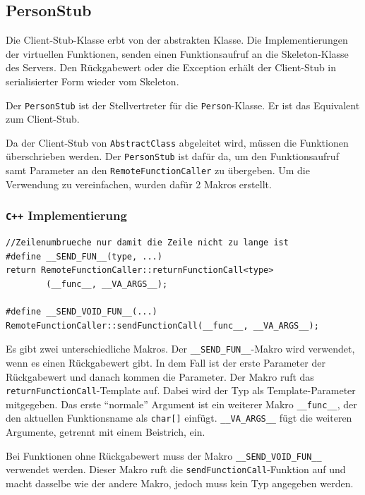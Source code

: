 \documentclass[a4paper,oneside,10pt]{report}
\begin{document}
\subsection{PersonStub}

Die Client-Stub-Klasse erbt von der abstrakten Klasse. Die Implementierungen der virtuellen Funktionen, senden einen Funktionsaufruf an die Skeleton-Klasse des Servers. Den Rückgabewert oder die Exception erhält der Client-Stub in serialisierter Form wieder vom Skeleton. 

Der \texttt{PersonStub} ist der Stellvertreter für die \texttt{Person}-Klasse. Er ist das Equivalent zum Client-Stub. 

Da der Client-Stub von \texttt{AbstractClass} abgeleitet wird, müssen die Funktionen überschrieben werden. Der \texttt{PersonStub} ist dafür da, um den Funktionsaufruf samt Parameter an den \texttt{RemoteFunctionCaller} zu übergeben. Um die Verwendung zu vereinfachen, wurden dafür 2 Makros erstellt. 

\subsubsection{\texttt{C++} Implementierung}

\begin{lstlisting}
//Zeilenumbrueche nur damit die Zeile nicht zu lange ist
#define __SEND_FUN__(type, ...) 
return RemoteFunctionCaller::returnFunctionCall<type>
		(__func__, __VA_ARGS__);

#define __SEND_VOID_FUN__(...) 
RemoteFunctionCaller::sendFunctionCall(__func__, __VA_ARGS__);
\end{lstlisting}


Es gibt zwei unterschiedliche Makros. Der \texttt{\_\_SEND\_FUN\_\_}-Makro wird verwendet, wenn es einen Rückgabewert gibt. In dem Fall ist der erste Parameter der Rückgabewert und danach kommen die Parameter. Der Makro ruft das \texttt{returnFunctionCall}-Template auf. Dabei wird der Typ als Template-Parameter mitgegeben. Das erste "`normale"' Argument ist ein weiterer Makro \texttt{\_\_func\_\_}, der den aktuellen Funktionsname als \texttt{char[]} einfügt. \texttt{\_\_VA\_ARGS\_\_} fügt die weiteren Argumente, getrennt mit einem Beistrich, ein. 

Bei Funktionen ohne Rückgabewert muss der Makro \texttt{\_\_SEND\_VOID\_FUN\_\_} verwendet werden. Dieser Makro ruft die \texttt{sendFunctionCall}-Funktion auf und macht dasselbe wie der andere Makro, jedoch muss kein Typ angegeben werden. 
\end{document}
